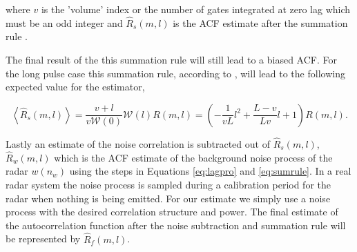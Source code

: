 \documentclass[draft,ras]{agutex}
\begin{document}
\begin{article}
\noindent where $v$ is the 'volume' index or the number of gates integrated at zero lag which must be an odd integer and $\hat{R}_s(m,l)$ is the ACF estimate after the summation rule \citep{nygren1996}. 

The final result of the this summation rule will still lead to a biased ACF. For the long pulse case this summation rule, according to \citet{nygren1996}, will lead to the following expected value for the estimator,

\begin{equation}
\label{eq:sumruleest}
\left\langle\hat{R}_s(m,l) \right\rangle  =\frac{v+l}{v\mathcal{W}(0)}\mathcal{W}(l)R(m,l) =\left(-\frac{1}{vL}l^2+\frac{L-v}{Lv}l+1\right)   R(m,l).
\end{equation}





Lastly an estimate of the noise correlation is subtracted out of $\hat{R}_s(m,l)$, $\hat{R}_w(m,l)$ which is the ACF estimate of the background noise process of the radar $w(n_w)$ using the steps in Equations \ref{eq:lagpro} and \ref{eq:sumrule}. In a real radar system the noise process is sampled during a calibration period for the radar when nothing is being emitted. For our estimate we simply use a noise process with the desired correlation structure and power. The final estimate of the autocorrelation function after the noise subtraction and summation rule will be represented by $\hat{R}_f(m,l)$.



\end{article}
\end{document}
